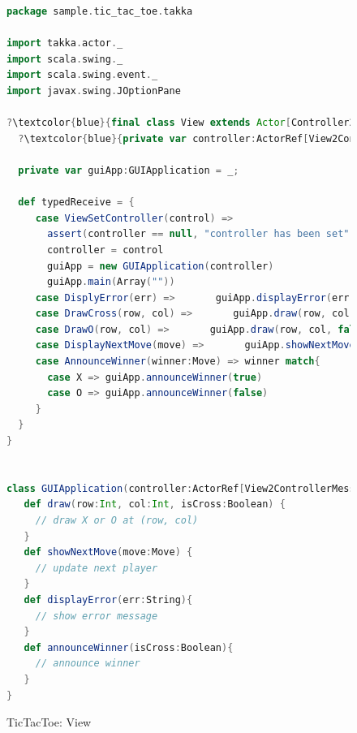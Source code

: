 \begin{figure}[p]
\begin{lstlisting}[language=scala, escapechar=?]
package sample.tic_tac_toe.takka

import takka.actor._
import scala.swing._
import scala.swing.event._
import javax.swing.JOptionPane

?\textcolor{blue}{final class View extends Actor[Controller2ViewMessage]}?{
  ?\textcolor{blue}{private var controller:ActorRef[View2ControllerMessage]}? = _
   
  private var guiApp:GUIApplication = _;
      
  def typedReceive = {
     case ViewSetController(control) =>
       assert(controller == null, "controller has been set")
       controller = control
       guiApp = new GUIApplication(controller)
       guiApp.main(Array(""))              
     case DisplyError(err) =>       guiApp.displayError(err)
     case DrawCross(row, col) =>       guiApp.draw(row, col, true)
     case DrawO(row, col) =>       guiApp.draw(row, col, false)
     case DisplayNextMove(move) =>       guiApp.showNextMove(move)
     case AnnounceWinner(winner:Move) => winner match{
       case X => guiApp.announceWinner(true)
       case O => guiApp.announceWinner(false)
     }
  }
}


class GUIApplication(controller:ActorRef[View2ControllerMessage]) extends SimpleSwingApplication {
   def draw(row:Int, col:Int, isCross:Boolean) { 
     // draw X or O at (row, col)
   }
   def showNextMove(move:Move) {
     // update next player
   }
   def displayError(err:String){
     // show error message
   }
   def announceWinner(isCross:Boolean){
     // announce winner
   }
}
\end{lstlisting}
\caption{TicTacToe: View}
\label{TTT_view}
\end{figure}


